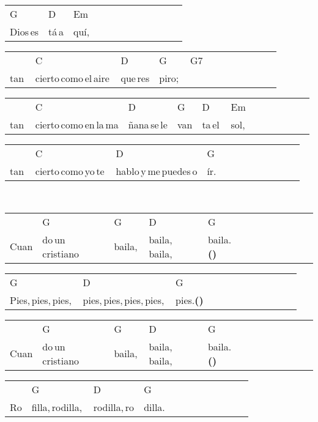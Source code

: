 \begin{multicols}{2}
\noindent
\begin{minipage}{\columnwidth}
\noindent
\noindent
\begin{tabular}{llllllllllll}
G&D&Em\\
Dios\,es&tá\,a&quí,
\end{tabular}

\noindent
\begin{tabular}{llllllllllll}
&C&D&G&G7\\
tan\,&cierto\,como\,el\,aire\,&que\,res&piro;\,&
\end{tabular}

\noindent
\begin{tabular}{llllllllllll}
&C&D&G&D&Em\\
tan\,&cierto\,como\,en\,la\,ma&ñana\,se\,le&van&ta\,el\,&sol,
\end{tabular}

\noindent
\begin{tabular}{llllllllllll}
&C&D&G\\
tan\,&cierto\,como\,yo\,te\,&hablo\,y\,me\,puedes\,o&ír.
\end{tabular}
\end{minipage}\\

\noindent
\begin{minipage}{\columnwidth}
\noindent
\noindent
\begin{tabular}{llllllllllll}
&G&G&D&G\\
Cuan&do\,un\,cristiano\,&baila,\,&baila,\,baila,\,&baila.\textbf{(\texttimes2)}
\end{tabular}

\noindent
\begin{tabular}{llllllllllll}
G&D&G\\
Pies,\,pies,\,pies,\,&pies,\,pies,\,pies,\,pies,\,&pies.\textbf{(\texttimes2)}
\end{tabular}

\noindent
\begin{tabular}{llllllllllll}
&G&G&D&G\\
Cuan&do\,un\,cristiano\,&baila,\,&baila,\,baila,\,&baila.\textbf{(\texttimes2)}
\end{tabular}

\noindent
\begin{tabular}{llllllllllll}
&G&D&G\\
Ro&filla,\,rodilla,\,&rodilla,\,ro&dilla.
\end{tabular}


\end{minipage}
\end{multicols}
